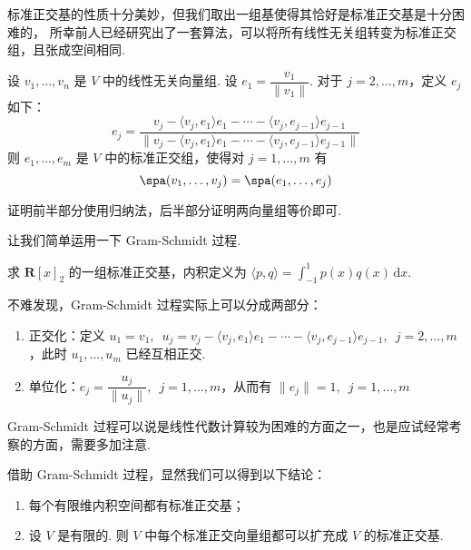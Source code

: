 标准正交基的性质十分美妙，但我们取出一组基使得其恰好是标准正交基是十分困难的，
所幸前人已经研究出了一套算法，可以将所有线性无关组转变为标准正交组，且张成空间相同.

\begin{theorem} 
    设 $v_1, \ldots ,v_n$ 是 $ V $ 中的线性无关向量组.
    设 $e_1 = \dfrac{v_1}{\lVert v_1 \rVert}$. 对于 $ j = 2, \ldots , m$，定义 $ e_j $ 如下：
    \[ e_j = \frac{v_j - \langle v_j, e_1 \rangle e_1 - \cdots - \langle v_j, e_{j - 1} \rangle e_{j - 1} }{\lVert v_j - \langle v_j, e_1 \rangle e_1 - \cdots - \langle v_j, e_{j - 1} \rangle e_{j - 1} \rVert}\]
    则 $e_1, \ldots , e_m $ 是 $ V $ 中的标准正交组，使得对 $ j = 1, \ldots , m $ 有
    \[ \spa(v_1, \ldots, v_j) = \spa(e_1, \ldots, e_j) \]
\end{theorem}

证明前半部分使用归纳法，后半部分证明两向量组等价即可.

让我们简单运用一下 Gram-Schmidt 过程.
\begin{example}
    求 $\mathbf{R}[x]_2$ 的一组标准正交基，内积定义为 $\langle p, q \rangle = \displaystyle\int_{-1}^1 p(x)q(x)\,\mathrm{d}x$.
\end{example}

不难发现，Gram-Schmidt 过程实际上可以分成两部分：
\begin{enumerate}
    \item 正交化：定义 $ u_1 = v_1 , \enspace u_j = v_j - \langle v_j, e_1 \rangle e_1 - \cdots - \langle v_j, e_{j - 1} \rangle e_{j - 1},
    \enspace j = 2, \ldots , m$，此时 $u_1, \ldots , u_m$ 已经互相正交.

    \item 单位化：$ e_j = \dfrac{u_j}{\lVert u_j \rVert} , \enspace j = 1, \ldots , m$，从而有 $\lVert e_j \rVert = 1, \enspace j = 1, \ldots , m$
\end{enumerate}

Gram-Schmidt 过程可以说是线性代数计算较为困难的方面之一，也是应试经常考察的方面，需要多加注意.

借助 Gram-Schmidt 过程，显然我们可以得到以下结论：
\begin{enumerate}
    \item 每个有限维内积空间都有标准正交基；

    \item 设 $ V $ 是有限的. 则 $ V $ 中每个标准正交向量组都可以扩充成 $ V $ 的标准正交基.
\end{enumerate}
\vspace{2ex}

